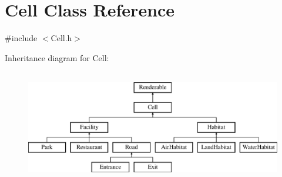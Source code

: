 \hypertarget{classCell}{\section{Cell Class Reference}
\label{classCell}
}


{\ttfamily \#include $<$Cell.\+h$>$}

Inheritance diagram for Cell\+:\begin{figure}[H]
\begin{center}
\leavevmode
\includegraphics[height=5.000000cm]{classCell}
\end{center}
\end{figure}
